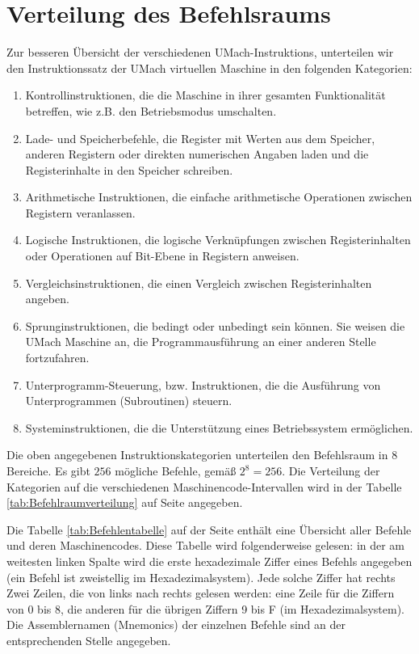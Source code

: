 \section{Verteilung des Befehlsraums}
Zur besseren Übersicht der verschiedenen UMach-\glspl{Instruktion}, unterteilen
wir den \gls{Instruktionssatz} der UMach virtuellen Maschine in den folgenden
Kategorien:

\begin{enumerate}
  \item Kontrollinstruktionen,  die die Maschine in ihrer gesamten
    Funktionalität betreffen, wie z.B. den Betriebsmodus umschalten.
  \item Lade- und Speicherbefehle, die Register mit Werten aus dem Speicher, 
    anderen Registern oder direkten numerischen Angaben laden und die
    Registerinhalte in den Speicher schreiben.
  \item Arithmetische Instruktionen, die einfache arithmetische Operationen
    zwischen Registern veranlassen.
  \item Logische Instruktionen, die logische Verknüpfungen zwischen
    Registerinhalten oder Operationen auf Bit-Ebene in Registern anweisen.
  \item Vergleichsinstruktionen, die einen Vergleich zwischen
    Registerinhalten angeben.
  \item Sprunginstruktionen, die bedingt oder unbedingt sein können.
    Sie weisen die UMach Maschine an, die Programmausführung an einer anderen
    Stelle fortzufahren.
  \item Unterprogramm-Steuerung, bzw. Instruktionen, die die Ausführung von
    Unterprogrammen (Subroutinen) steuern.
  \item Systeminstruktionen, die die Unterstützung eines
    Betriebssystem ermöglichen.
\end{enumerate}

Die oben angegebenen Instruktionskategorien unterteilen den \gls{Befehlsraum} in
8 Bereiche. Es gibt $256$ mögliche Befehle, gemäß $2^{8} = 256$.
Die Verteilung der Kategorien auf die verschiedenen Maschinencode-Intervallen
wird in der Tabelle \ref{tab:Befehlraumverteilung} auf Seite
\pageref{tab:Befehlraumverteilung} angegeben.




Die Tabelle \ref{tab:Befehlentabelle} auf der Seite 
\pageref{tab:Befehlentabelle} enthält eine Übersicht aller Befehle und
deren Maschinencodes.
Diese Tabelle wird folgenderweise gelesen:
in der am weitesten linken Spalte wird die erste hexadezimale Ziffer eines
Befehls angegeben (ein Befehl ist zweistellig im Hexadezimalsystem).
Jede solche Ziffer hat rechts Zwei Zeilen, die von links nach rechts gelesen
werden: eine Zeile für die Ziffern von 0 bis 8, die anderen für die übrigen
Ziffern 9 bis F (im Hexadezimalsystem). Die Assemblernamen (Mnemonics) der
einzelnen Befehle sind an der entsprechenden Stelle angegeben.

